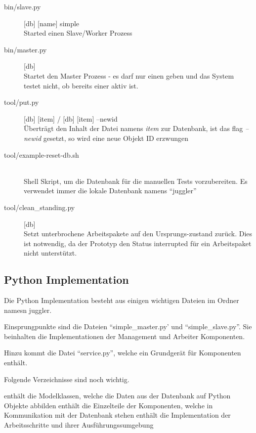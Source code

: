\begin{description}
    \item[bin/slave.py] [db] [name] simple \hfill \\
        Started einen Slave/Worker Prozess
    \item[bin/master.py] [db] \hfill \\
        Startet den Master Prozess - es darf nur einen geben und das System testet nicht, ob bereits einer aktiv ist.
    \item[tool/put.py] [db] [item] / [db] [item] --newid \hfill \\
        Überträgt den Inhalt der Datei namens \textit{item} zur Datenbank,
        ist das flag \textit{--newid} gesetzt, so wird eine neue Objekt ID erzwungen
    \item[tool/example-reset-db.sh] \hfill \\
        Shell Skript, um die Datenbank für die manuellen Tests vorzubereiten.
        Es verwendet immer die lokale Datenbank namens ``juggler''
    \item[tool/clean\_standing.py] [db]\hfill \\
        Setzt unterbrochene Arbeitspakete auf den Ursprungs-zustand zurück.
        Dies ist notwendig, da der Prototyp den Status interrupted für ein Arbeitspaket nicht unterstützt.
\end{description}

\subsection{Python Implementation}

Die Python Implementation besteht aus einigen wichtigen Dateien im Ordner namesn juggler.

Einsprungpunkte sind die Dateien ``simple\_master.py' und ``simple\_slave.py''.
Sie beinhalten die Implementationen der Management und Arbeiter Komponenten.

Hinzu kommt die Datei ``service.py'', welche ein Grundgerät für Komponenten enthält.

Folgende Verzeichnisse sind noch wichtig.

\begin{description}
    \dhitem[model] 
        enthält  die Modelklassen,
        welche die Daten aus der Datenbank auf Python Objekte abbilden
    \dhitem[handler] 
        enthält die Einzelteile der Komponenten,
        welche in Kommunikation mit der Datenbank stehen
    \dhitem[process]
        enthält die Implementation der Arbeitsschritte
        und ihrer Ausführungssumgebung
\end{description}



